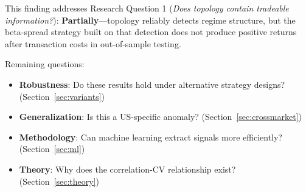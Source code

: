 This finding addresses Research Question 1 (\textit{Does topology contain tradeable information?}): \textbf{Partially}---topology reliably detects regime structure, but the beta-spread strategy built on that detection does not produce positive returns after transaction costs in out-of-sample testing.

Remaining questions:
\begin{itemize}
    \item \textbf{Robustness}: Do these results hold under alternative strategy designs? (Section~\ref{sec:variants})
    \item \textbf{Generalization}: Is this a US-specific anomaly? (Section~\ref{sec:crossmarket})
    \item \textbf{Methodology}: Can machine learning extract signals more efficiently? (Section~\ref{sec:ml})
    \item \textbf{Theory}: Why does the correlation-CV relationship exist? (Section~\ref{sec:theory})
\end{itemize}
